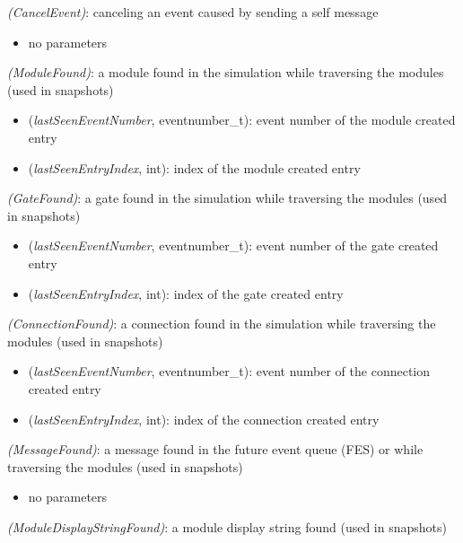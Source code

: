  \textit{(CancelEvent)}: canceling an event caused by sending a self message

\begin{itemize}
  \item no parameters
\end{itemize}

 \textit{(ModuleFound)}: a module found in the simulation while traversing the modules (used in snapshots)

\begin{itemize}
  \item \tbf{\#} (\textit{lastSeenEventNumber}, eventnumber\_t): event number of the module created entry
  \item {} (\textit{lastSeenEntryIndex}, int): index of the module created entry
\end{itemize}

 \textit{(GateFound)}: a gate found in the simulation while traversing the modules (used in snapshots)

\begin{itemize}
  \item \tbf{\#} (\textit{lastSeenEventNumber}, eventnumber\_t): event number of the gate created entry
  \item {} (\textit{lastSeenEntryIndex}, int): index of the gate created entry
\end{itemize}

 \textit{(ConnectionFound)}: a connection found in the simulation while traversing the modules (used in snapshots)

\begin{itemize}
  \item \tbf{\#} (\textit{lastSeenEventNumber}, eventnumber\_t): event number of the connection created entry
  \item {} (\textit{lastSeenEntryIndex}, int): index of the connection created entry
\end{itemize}

 \textit{(MessageFound)}: a message found in the future event queue (FES) or while traversing the modules (used in snapshots)

\begin{itemize}
  \item no parameters
\end{itemize}

 \textit{(ModuleDisplayStringFound)}: a module display string found (used in snapshots)

